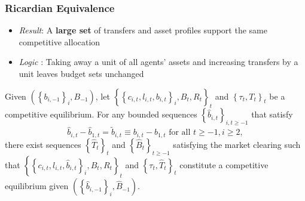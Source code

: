 \documentclass{beamer}
\begin{document}
%
%
%
%




\begin{frame}
 \frametitle{Ricardian Equivalence}
 \begin{itemize}
  \item \emph{Result}: A \textbf{large set} of transfers and asset profiles support the same competitive allocation
  \item \emph{Logic }: Taking away a unit of all agents' assets and increasing transfers by a unit leaves budget sets unchanged
 \end{itemize}
\begin{theorem}

Given $\left( \left \{ b_{i,-1}\right \}
_{i},B_{-1}\right) $, let $\left \{ \left \{ c_{i,t},l_{i,t},b_{i,t}\right \} _{i},B_{t},R_{t}\right \} _{t} $ and $\left \{ \tau _{t},T_{t}\right
\} _{t}$ be a competitive equilibrium. For any bounded sequences $%
\left \{ \hat{b}_{i,t}\right \} _{i,t\geq -1}$ that satisfy
\begin{equation*}
\hat{b}_{i,t}-\hat{b}_{1,t}=\tilde{b}_{i,t}\equiv b_{i,t}	-b_{1,t}\text{ for all }t\geq -1,i\geq 2,
\end{equation*}%
there exist  sequences $\left \{ \hat{T}_{t}\right \} _{t}$ and $%
\left \{ \hat{B}_{t}\right \} _{t\geq -1}$ satisfying the market clearing such that $\left \{ \left \{ c_{i,t},l_{i,t},\hat{b}%
_{i,t}\right \} _{i},\hat{B}_{t},R_{t}\right \} _{t}$ and $\left \{
\tau _{t},\hat{T}_{t}\right \} _{t}$ constitute a competitive
equilibrium given $\left( \left \{ \hat{b}_{i,-1}\right \} _{i},\hat{B}%
_{-1}\right) $.
\end{theorem}


\end{frame}
\end{document}
